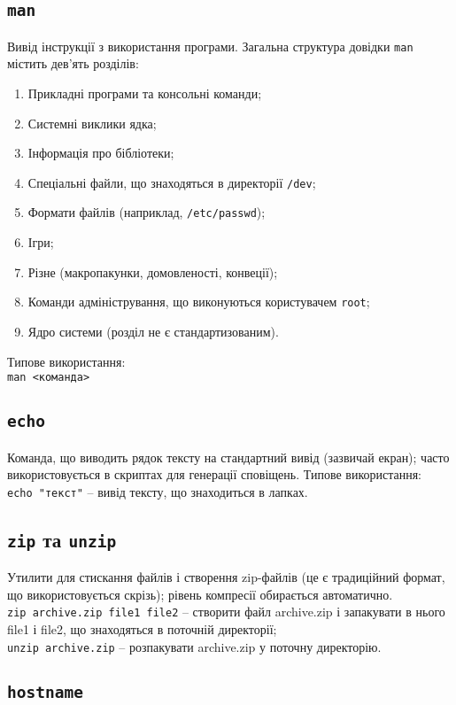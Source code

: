 \documentclass[10pt,a4paper]{fancyhandout}
\begin{document}
\subsection{\texttt{man}}
Вивід інструкції з використання програми. Загальна структура довідки \texttt{man} містить дев'ять розділів:
\begin{enumerate}
	\item Прикладні програми та консольні команди;
	\item Системні виклики ядка;
	\item Інформація про бібліотеки;
	\item Спеціальні файли, що знаходяться в директорії \texttt{/dev};
	\item Формати файлів (наприклад, \texttt{/etc/passwd});
	\item Ігри;
	\item Різне (макропакунки, домовленості, конвеції);
	\item Команди адміністрування, що виконуються користувачем \texttt{root};
	\item Ядро системи (розділ не є стандартизованим).
\end{enumerate}
Типове використання: \\
\texttt{man <команда>}
\goodbreak

\subsection{\texttt{echo}}
Команда, що виводить рядок тексту на стандартний вивід (зазвичай екран); часто використовується в скриптах для генерації сповіщень. Типове використання: \\
\texttt{echo "текст"} -- вивід тексту, що знаходиться в лапках.
\goodbreak

\subsection{\texttt{zip} та \texttt{unzip}}
Утилити для стискання файлів і створення zip-файлів (це є традиційний формат, що використовується скрізь); рівень компресії обирається автоматично.\\
\texttt{zip archive.zip file1 file2} -- створити файл archive.zip і запакувати в нього file1 і file2, що знаходяться в поточній директорії; \\
\texttt{unzip archive.zip} -- розпакувати archive.zip у поточну директорію.
\goodbreak

\subsection{\texttt{hostname}}
\goodbreak
\end{document}
